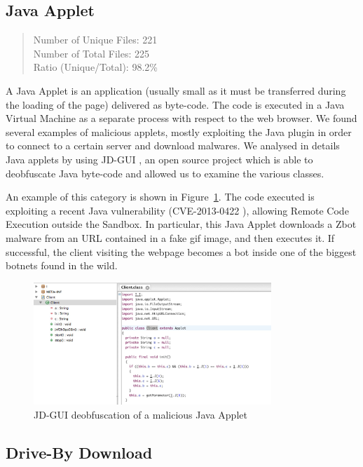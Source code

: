 \subsection{Java Applet}

\begin{quote}
Number of Unique Files: 221\\
Number of Total Files: 225\\
Ratio (Unique/Total): 98.2\%
\end{quote}

A Java Applet is an application (usually small as it must be transferred during the loading of the page) delivered as byte-code. The code is executed in a Java Virtual Machine as a separate process with respect to the web browser. We found several examples of malicious applets, mostly exploiting the Java plugin in order to connect to a certain server and download malwares. We analysed in details Java applets by using JD-GUI \cite{jdgui}, an open source project which is able to deobfuscate Java byte-code and allowed us to examine the various classes.

An example of this category is shown in Figure~\ref{fig:javaApplet}. The code executed is exploiting a recent Java vulnerability (CVE-2013-0422 \cite{cveJava}), allowing Remote Code Execution outside the Sandbox. In particular, this Java Applet downloads a Zbot malware from an URL contained in a fake gif image, and then executes it. If successful, the client visiting the webpage becomes a bot inside one of the biggest botnets found in the wild.

 \begin{figure}[H]
\centerline{\includegraphics[width=0.8\textwidth]{Images/javaApplet.jpg}}
\caption{JD-GUI deobfuscation of a malicious Java Applet\label{fig:javaApplet}}
\end{figure}

\subsection{Drive-By Download}

